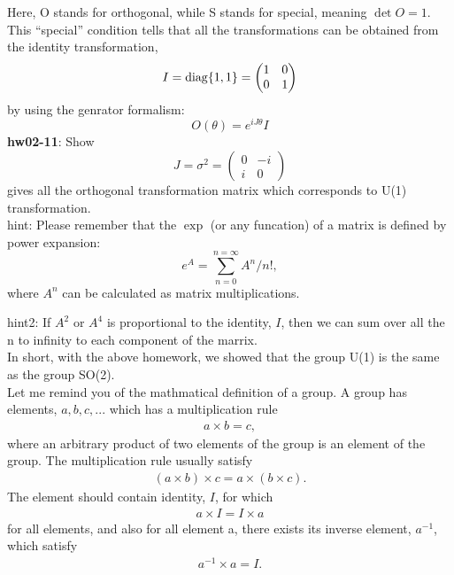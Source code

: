 \documentclass[12pt]{article}
\begin{document}
Here, O stands for orthogonal, while S stands for
special, meaning
$\det{O} = 1.$
This ``special'' condition tells that all the transformations
can be obtained from the identity transformation,
\begin{equation}
  \label{eq:6}
  I = {\rm diag}\{1,1\} =
  \begin{pmatrix}
    1&0\\
    0&1
  \end{pmatrix}
\end{equation}
by using the genrator formalism:
\begin{equation}
  \label{eq:7}
O(\theta) = e^{i J \theta} I
\end{equation}  
{\bf hw02-11}: Show
\begin{equation}
  \label{eq:8}
J = \sigma^2 =
\begin{pmatrix}
  0&-i\\
  i&0
\end{pmatrix}
\end{equation}
gives all the orthogonal transformation matrix which
corresponds to U(1) transformation.\\

hint: Please remember that the $\exp$ (or any
funcation) of a matrix is defined by power expansion:
\begin{equation}
  \label{eq:9}
e^{A} = \sum_{n=0}^{n=\infty} A^n/n!,
\end{equation}
where $A^n$ can be calculated as matrix multiplications.

hint2: If $A^2$ or $A^4$ is proportional to the identity, $I$,
then we can sum over all the n to infinity to each
component of the marrix.\\

In short, with the above homework, we showed that
the group U(1) is the same as the group SO(2).\\

Let me remind you of the mathmatical definition of
a group.  A group has elements,
$a, b, c, ...$
which has a multiplication rule
\begin{eqnarray}
  a\times b = c,
\end{eqnarray}
where an arbitrary product of two elements of the group
is an element of the group.  The multiplication rule
usually satisfy
\begin{eqnarray}
(a\times b)\times c = a\times (b\times c).
\end{eqnarray}
The element should contain identity, $I$, for which
\begin{eqnarray}
a\times I = I\times a
\end{eqnarray}
for all elements, and also for all element a, there
exists its inverse element, $a^{-1}$, which satisfy
\begin{eqnarray}
a^{-1} \times a = I.
\end{eqnarray}
\end{document}
